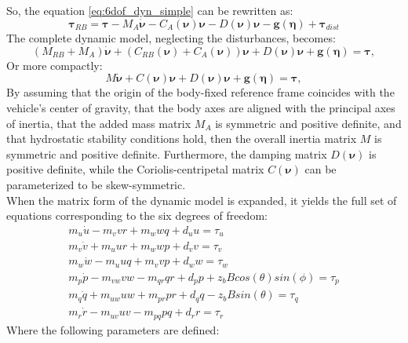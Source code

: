 So, the equation \ref{eq:6dof_dyn_simple} can be rewritten as:
\begin{equation}
    \mathbf{\tau}_{RB} = \mathbf{\tau} - M_A\dot{\mathbf{\nu}}-C_A(\mathbf{\nu})\mathbf{\nu} - D(\mathbf{\nu})\mathbf{\nu} - \mathbf{g}(\mathbf{\eta}) + \mathbf{\tau}_{dist}
    \label{eq:6dof_tau}
\end{equation}
The complete dynamic model, neglecting the disturbances, becomes:
\begin{equation}
    (M_{RB} + M_A)\dot{\mathbf{\nu}} + (C_{RB}(\mathbf{\nu}) + C_A(\mathbf{\nu}))\mathbf{\nu} + D(\mathbf{\nu})\mathbf{\nu} + \mathbf{g}(\mathbf{\eta}) = \mathbf{\tau},
\end{equation}
Or more compactly:
\begin{equation}
    M\dot{\mathbf{\nu}} + C(\mathbf{\nu})\mathbf{\nu} + D(\mathbf{\nu})\mathbf{\nu} + \mathbf{g}(\mathbf{\eta}) = \mathbf{\tau},
    \label{eq:6dof_dyn_complete}
\end{equation}
By assuming that the origin of the body-fixed reference frame coincides with the vehicle's center of gravity, that the body axes are aligned with the principal axes of inertia,
that the added mass matrix $M_A$ is symmetric and positive definite, and that hydrostatic stability conditions hold, then the overall inertia matrix $M$ is symmetric and 
positive definite. Furthermore, the damping matrix $D(\mathbf{\nu})$ is positive definite, while the Coriolis-centripetal matrix $C(\mathbf{\nu})$ 
can be parameterized to be skew-symmetric.\\
When the matrix form of the dynamic model is expanded, it yields the full set of equations corresponding to the six degrees of freedom:
\begin{equation}
    \begin{split}
        m_u\dot{u} - m_vvr + m_wwq + d_uu = \tau_u \\
        m_v\dot{v} + m_uur + m_wwp + d_vv = \tau_v \\
        m_w\dot{w} - m_uuq + m_vvp + d_ww = \tau_w \\
        m_p\dot{p} - m_{vw}vw - m_{qr}qr + d_pp + z_bBcos(\theta)sin(\phi) = \tau_p \\
        m_q\dot{q} + m_{uw}uw + m_{pr}pr + d_qq - z_bBsin(\theta) = \tau_q \\
        m_r\dot{r} - m_{uv}uv - m_{pq}pq + d_rr = \tau_r
    \end{split}
    \label{eq:6dof_expanded}
\end{equation}
Where the following parameters are defined:\\
